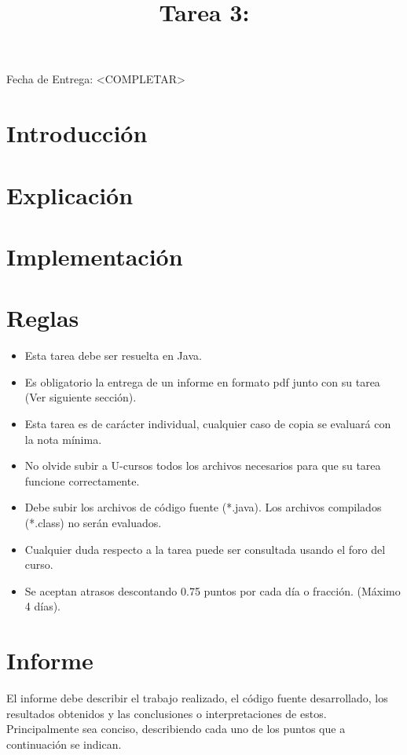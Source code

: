 \documentclass[dcc]{fcfmcourse}
\title{Tarea 3: }
\begin{document}
\maketitle
\vspace{-2ex}
\begin{center}
Fecha de Entrega: <COMPLETAR>
\end{center}


\section{Introducción}

\section{Explicación}

\section{Implementación}
\section{Reglas}

\begin{itemize}
    \item Esta tarea debe ser resuelta en Java.
    \item Es obligatorio la entrega de un informe en formato pdf junto con su tarea (Ver siguiente sección).
    \item Esta tarea es de carácter individual, cualquier caso de copia se evaluará con la nota mínima.
    \item No olvide subir a U-cursos todos los archivos necesarios para que su tarea funcione correctamente.
    \item Debe subir los archivos de código fuente (*.java). Los archivos compilados (*.class) no serán evaluados.
    \item Cualquier duda respecto a la tarea puede ser consultada usando el foro del curso.
    \item Se aceptan atrasos descontando 0.75 puntos por cada día o fracción. (Máximo 4 días).
\end{itemize}

\section{Informe}

El informe debe describir el trabajo realizado, el código fuente desarrollado, los resultados obtenidos y las conclusiones o interpretaciones de estos. Principalmente sea conciso, describiendo cada uno de los puntos que a continuación se indican.
\end{document}
